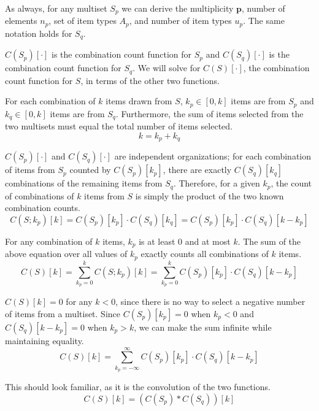 \documentclass{article}
\begin{document}
As always, for any multiset $S_p$ we can derive the multiplicity $\bm{p}$, number of elements $n_p$, set of item types $A_p$, and number of item types $u_p$. The same notation holds for $S_q$.

$C(S_p)[\cdot]$ is the combination count function for $S_p$ and $C(S_q)[\cdot]$ is the combination count function for $S_q$. We will solve for $C(S)[\cdot]$, the combination count function for $S$, in terms of the other two functions.

For each combination of $k$ items drawn from $S$, $k_p \in [0, k]$ items are from $S_p$ and $k_q\in [0, k]$ items are from $S_q$. Furthermore, the sum of items selected from the two multisets must equal the total number of items selected.
\begin{equation}
    k = k_p + k_q
\end{equation}

$C(S_p)[\cdot]$ and $C(S_q)[\cdot]$ are independent organizations; for each combination of items from $S_p$ counted by $C(S_p)[k_p]$, there are exactly $C(S_q)[k_q]$ combinations of the remaining items from $S_q$. Therefore, for a given $k_p$, the count of combinations of $k$ items from $S$ is simply the product of the two known combination counts.
\begin{equation}
    C(S; k_p)[k] = C(S_p)[k_p] \cdot C(S_q)[k_q] = C(S_p)[k_p] \cdot C(S_q)[k - k_p]
\end{equation}

For any combination of $k$ items, $k_p$ is at least $0$ and at most $k$. The sum of the above equation over all values of $k_p$ exactly counts all combinations of $k$ items.
\begin{equation}
    C(S)[k] = \sum_{k_p = 0}^{k} C(S; k_p)[k] = \sum_{k_p = 0}^{k} C(S_p)[k_p] \cdot C(S_q)[k - k_p]
\end{equation}

$C(S)[k]=0$ for any $k<0$, since there is no way to select a negative number of items from a multiset. Since $C(S_p)[k_p] = 0$ when $k_p < 0$ and $C(S_q)[k - k_p] = 0$ when $k_p > k$, we can make the sum infinite while maintaining equality.
\begin{equation}
    C(S)[k] = \sum_{k_p = -\infty}^{\infty} C(S_p)[k_p] \cdot C(S_q)[k - k_p]
\end{equation}

This should look familiar, as it is the convolution of the two functions.
\begin{equation}
    C(S)[k] = (C(S_p) * C(S_q))[k]
\end{equation}
\end{document}

